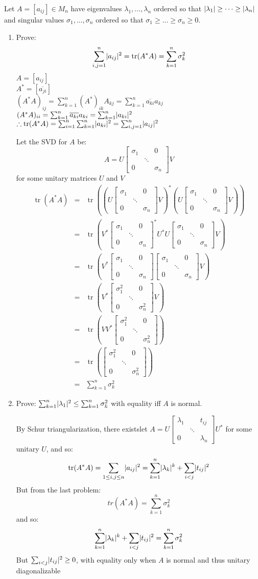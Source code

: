 \documentclass[letterpaper,12pt,fleqn]{article}
\renewcommand{\l}{\lambda}
\renewcommand{\o}{\sigma}
\renewcommand{\l}{\lambda}
\newcommand{\conj}[1]{\overline{#1}}
\newcommand{\diag}[2]{\begin{bmatrix} #1 & & 0 \\ & \ddots & \\ 0 & & #2 \end{bmatrix}}
\DeclareMathOperator{\tr}{tr}
\begin{document}
Let $A=[a_{ij}]\in M_n$ have eigenvalues $\l_1,\ldots,\l_n$ ordered so that
$\abs{\l_1}\ge\cdots\ge\abs{\l_n}$ and singular values $\o_1,\ldots,\o_n$ ordered so
that $\o_1\ge\ldots\ge\o_n\ge0$.
\begin{enumerate}[label={\alph*)}]
\item Prove:
  \[\sum_{i,j=1}^n\abs{a_{ij}}^2=\tr(A^*A)=\sum_{k=1}^n\o_k^2\]
  $A=[a_{ij}]$ \\
  $A^*=[\conj{a_{ji}}]$ \\
  $(A^*A)_{ij}=\sum_{k=1}^n(A^*)_{ik}A_{kj}=\sum_{k=1}^n\conj{a_{ki}}a_{kj}$ \\
  $(A^*A)_{ii}=\sum_{k=1}^n\conj{a_{ki}}a_{ki}=\sum_{k=1}^n\abs{a_{ki}}^2$ \\
  $\therefore\tr(A^*A)=\sum_{i=1}^n\sum_{k=1}^n\abs{a_{ki}}^2=
  \sum_{i,j=1}^n\abs{a_{ij}}^2$

  \newcommand{\me}{\diag{\o_1}{\o_n}}
  \newcommand{\mes}{\diag{\o_1^2}{\o_n^2}}

  Let the SVD for $A$ be:
  \[A=U\me V\]
  for some unitary matrices $U$ and $V$
  \begin{eqnarray*}
    \tr(A^*A) &=& \tr\left(\left(U\me V\right)^*\left(U\me V\right)\right) \\
    &=& \tr\left(V^*\me^*U^*U\me V\right) \\
    &=& \tr\left(V^*\me\me V\right) \\
    &=& \tr\left(V^*\mes V\right) \\
    &=& \tr\left(VV^*\mes\right) \\
    &=& \tr\left(\mes\right) \\
    &=& \sum_{k=1}^n\o_k^2
  \end{eqnarray*}

\item Prove: $\sum_{k=1}^n\abs{\l_1}^2\le\sum_{k=1}^n\o_k^2$ with equality iff
  $A$ is normal.

  \newcommand{\ml}{\begin{bmatrix}
      \l_1 & & t_{ij} \\ & \ddots & \\ 0 & & \l_n
  \end{bmatrix}}

  By Schur triangularization, there existslet $A=U\ml U^*$ for some unitary $U$, and so:
  \[\tr(A^*A)=\sum_{1\le i,j\le n}\abs{a_{ij}}^2=
  \sum_{k=1}^n\abs{\l_k}^k+\sum_{i<j}\abs{t_{ij}}^2\]
  But from the last problem:
  \[tr(A^*A)=\sum_{k=1}^n\o_k^2\]
  and so:
  \[\sum_{k=1}^n\abs{\l_k}^k+\sum_{i<j}\abs{t_{ij}}^2=\sum_{k=1}^n\o_k^2\]
  But $\sum_{i<j}\lvert t_{ij}\rvert^2\ge0$, with equality only when $A$ is normal and thus
  unitary diagonalizable


\end{enumerate}
\end{document}

